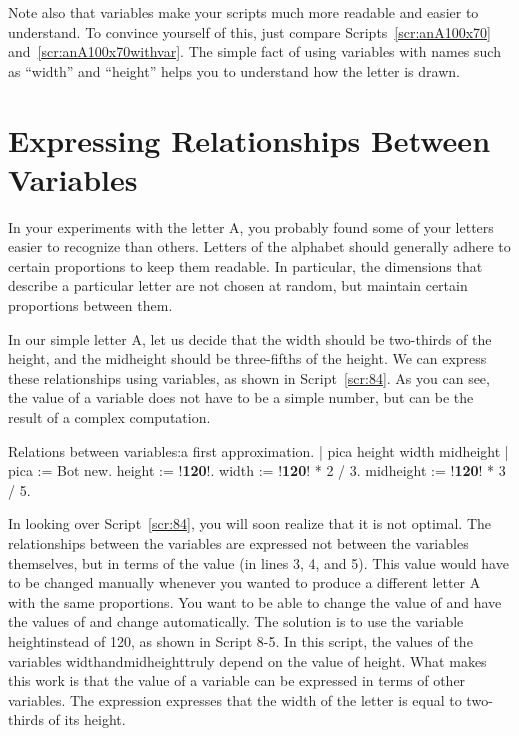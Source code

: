 \documentclass[a4paper,10pt,twoside]{book}
\begin{document}
Note also that variables make your scripts much more readable and easier to understand. To convince yourself of this, just compare Scripts~\ref{scr:anA100x70} and~\ref{scr:anA100x70withvar}. The simple fact of using variables with names such as “width” and “height” helps you to understand how the letter is drawn.


\section{Expressing Relationships Between Variables} 

In your experiments with the letter A, you probably found some of your letters easier to recognize than others. Letters of the alphabet should generally adhere to certain proportions to keep them readable. In particular, the dimensions that describe a particular letter are not chosen at random, but maintain certain proportions between them. 

In our simple letter A, let us decide that the width should be two-thirds of the height, and 
the midheight should be three-fifths of the height. We can express these relationships using 
variables, as shown in Script~\ref{scr:84}. As you can see, the value of a variable does not have to be a 
simple number, but can be the result of a complex computation. 


\begin{script}[84]{Relations between variables:a first approximation.}
| pica height width midheight | 
pica := Bot new. 
height := !\textbf{120}!. 
width := !\textbf{120}! * 2 / 3. 
midheight := !\textbf{120}! * 3 / 5. 
\end{script}

In looking over Script~\ref{scr:84}, you will soon realize that it is not optimal. The relationships 
between the variables are expressed not between the variables themselves, but in terms of 
the value  (in lines 3, 4, and 5). This value would have to be changed manually whenever 
you wanted to produce a different letter A with the same proportions. You want to be able to 
change the value of  and have the values of  and  change automatically. 
The solution is to use the variable heightinstead of 120, as shown in Script 8-5. In this script, 
the values of the variables widthandmidheighttruly depend on the value of height. What 
makes this work is that the value of a variable can be expressed in terms of other variables. 
The expression  expresses that the width of the letter is equal to 
two-thirds of its height. 
\end{document}
